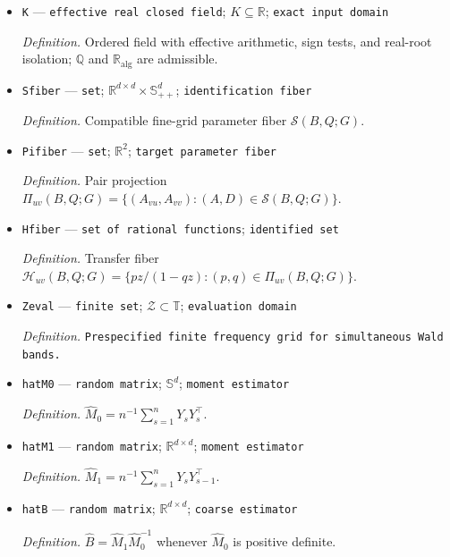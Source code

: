 \documentclass{article}
\begin{document}
\begin{itemize}
  \par\smallskip\noindent\emph{Definition.} Direct fine-grid causal transfer \(h_{uv}(z)=A_{vu}z/(1-A_{vv}z)\).
  \item \texttt{K} --- \texttt{effective real closed field}; \(K\subseteq\mathbb R\); \texttt{exact input domain}
  \par\smallskip\noindent\emph{Definition.} Ordered field with effective arithmetic, sign tests, and real-root isolation; \(\mathbb Q\) and \(\mathbb R_{\mathrm{alg}}\) are admissible.
  \item \texttt{Sfiber} --- \texttt{set}; \(\mathbb R^{d\times d}\times\mathbb S_{++}^{d}\); \texttt{identification fiber}
  \par\smallskip\noindent\emph{Definition.} Compatible fine-grid parameter fiber \(\mathcal S(B,Q;G)\).
  \item \texttt{Pifiber} --- \texttt{set}; \(\mathbb R^2\); \texttt{target parameter fiber}
  \par\smallskip\noindent\emph{Definition.} Pair projection \(\Pi_{uv}(B,Q;G)=\{(A_{vu},A_{vv}):(A,D)\in\mathcal S(B,Q;G)\}\).
  \item \texttt{Hfiber} --- \texttt{set of rational functions}; \texttt{identified set}
  \par\smallskip\noindent\emph{Definition.} Transfer fiber \(\mathcal H_{uv}(B,Q;G)=\{pz/(1-qz):(p,q)\in\Pi_{uv}(B,Q;G)\}\).
  \item \texttt{Zeval} --- \texttt{finite set}; \(\mathcal Z\subset\mathbb T\); \texttt{evaluation domain}
  \par\smallskip\noindent\emph{Definition.} \texttt{Prespecified finite frequency grid for simultaneous Wald bands.}
  \item \texttt{hatM0} --- \texttt{random matrix}; \(\mathbb S^d\); \texttt{moment estimator}
  \par\smallskip\noindent\emph{Definition.} \(\widehat M_0=n^{-1}\sum_{s=1}^{n}Y_sY_s^\top\).
  \item \texttt{hatM1} --- \texttt{random matrix}; \(\mathbb R^{d\times d}\); \texttt{moment estimator}
  \par\smallskip\noindent\emph{Definition.} \(\widehat M_1=n^{-1}\sum_{s=1}^{n}Y_sY_{s-1}^\top\).
  \item \texttt{hatB} --- \texttt{random matrix}; \(\mathbb R^{d\times d}\); \texttt{coarse estimator}
  \par\smallskip\noindent\emph{Definition.} \(\widehat B=\widehat M_1\widehat M_0^{-1}\) whenever \(\widehat M_0\) is positive definite.

\end{itemize}
\end{document}
